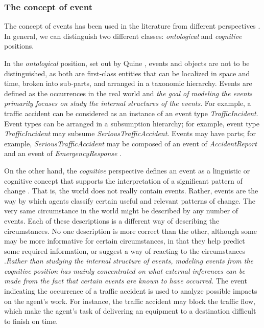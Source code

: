 \subsubsection{The concept of event} %
\label{ssub:the_concept_of_events}
The concept of events has been used in the literature from different perspectives \cite{worboys2005a}. In general, we can distinguish two different classes: \emph{ontological} and \emph{cognitive} positions. 

In the \emph{ontological} position, set out by Quine \cite{quine1985events}, events and objects are not to be distinguished, as both are first-class entities that can be localized in space and time, broken into sub-parts, and arranged in a taxonomic hierarchy. Events are defined as the occurrences in the real world and \emph{the goal of modeling the events primarily focuses on study the internal structures of the events}. For example, a traffic accident can be considered as an instance of an event type \emph{TrafficIncident}. Event types can be arranged in a subsumption hierarchy; for example, event type \emph{TrafficIncident} may subsume \emph{SeriousTrafficAccident}. Events may have parts; for example, \emph{SeriousTrafficAccident} may be composed of an event of \emph{AccidentReport} and an event of \emph{EmergencyResponse} \cite{worboys2005a}.  

On the other hand, the \emph{cognitive} perspective defines an event as a linguistic or cognitive concept that supports the interpretation of a significant pattern of change \cite{allen1994actions}. That is, the world does not really contain events. Rather, events are the way by which agents classify certain useful and relevant patterns of change. The very same circumstance in the world might be described by any number of events. Each of these descriptions is a different way of describing the circumstances. No one description is more correct than the other, although some may be more informative for certain circumstances, in that they help predict some required information, or suggest a way of reacting to the circumstances \cite{allen1994actions}.\emph{Rather than studying the internal structure of events, modeling events from the cognitive position has mainly concentrated on what external inferences can be made from the fact that certain events are known to have occurred.} The event indicating the occurrence of a traffic accident is used to analyze possible impacts on the agent's work. For instance, the traffic accident may block the traffic flow, which make the agent's task of delivering an equipment to a destination difficult to finish on time. 

